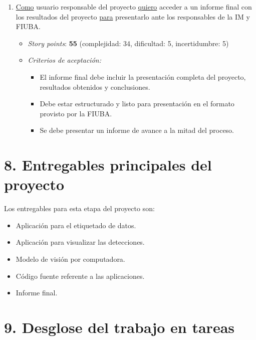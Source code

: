 \documentclass[
11pt, %
]{charter}
\begin{document}
\begin{enumerate}
  \item \underline{Como} usuario responsable del proyecto \underline{quiero} acceder a un informe final con los resultados del proyecto \underline{para} presentarlo ante los responsables de la IM y FIUBA.
        \begin{itemize}
          \item \textit{Story points}: \textbf{55} (complejidad: 34, dificultad: 5, incertidumbre: 5)
          \item \textit{Criterios de aceptación:}
                \begin{itemize}
                  \item El informe final debe incluir la presentación completa del proyecto, resultados obtenidos y conclusiones.
                  \item Debe estar estructurado y listo para presentación en el formato provisto por la FIUBA.
                  \item Se debe presentar un informe de avance a la mitad del proceso.
                \end{itemize}
        \end{itemize}
\end{enumerate}

\section{8. Entregables principales del proyecto}
\label{sec:entregables}

Los entregables para esta etapa del proyecto son:

\begin{itemize}
  \item Aplicación para el etiquetado de datos.
  \item Aplicación para visualizar las detecciones.
  \item Modelo de visión por computadora.
  \item Código fuente referente a las aplicaciones.
  \item Informe final.
\end{itemize}

\section{9. Desglose del trabajo en tareas}
\label{sec:wbs}
\end{document}
